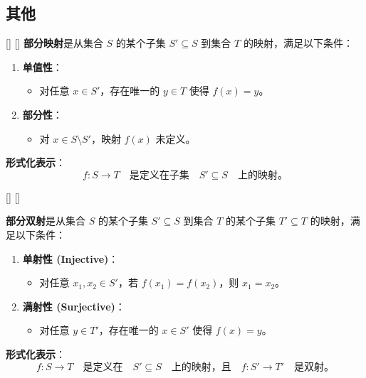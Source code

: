 \documentclass[UTF8]{ctexart}
\begin{document}
	\subsection{其他}
		\begin{dfn}
            []
            {}
            []
            []
				\textbf{部分映射}是从集合 \( S \) 的某个子集 \( S' \subseteq S \) 到集合 \( T \) 的映射，满足以下条件：
				\begin{enumerate}
					\item \textbf{单值性}：
						\begin{itemize}
							\item 对任意 \( x \in S' \)，存在唯一的 \( y \in T \) 使得 \( f(x) = y \)。
						\end{itemize}
					\item \textbf{部分性}：
						\begin{itemize}
							\item 对 \( x \in S \setminus S' \)，映射 \( f(x) \) 未定义。
						\end{itemize}
				\end{enumerate}
				
				\textbf{形式化表示}：
				\[
					f : S \to T \quad \text{是定义在子集} \quad S' \subseteq S \quad \text{上的映射。}
				\]
		\end{dfn}

		\begin{dfn}
            []
            {}
            []
            []
			
				\textbf{部分双射}是从集合 \( S \) 的某个子集 \( S' \subseteq S \) 到集合 \( T \) 的某个子集 \( T' \subseteq T \) 的映射，满足以下条件：
				\begin{enumerate}
					\item \textbf{单射性 (Injective)}：
						\begin{itemize}
							\item 对任意 \( x_1, x_2 \in S' \)，若 \( f(x_1) = f(x_2) \)，则 \( x_1 = x_2 \)。
						\end{itemize}
					\item \textbf{满射性 (Surjective)}：
						\begin{itemize}
							\item 对任意 \( y \in T' \)，存在唯一的 \( x \in S' \) 使得 \( f(x) = y \)。
						\end{itemize}
				\end{enumerate}
				
				\textbf{形式化表示}：
				\[
					f : S \to T \quad \text{是定义在} \quad S' \subseteq S \quad \text{上的映射，且} \quad f : S' \to T' \quad \text{是双射。}
				\]

		\end{dfn}
\end{document}
